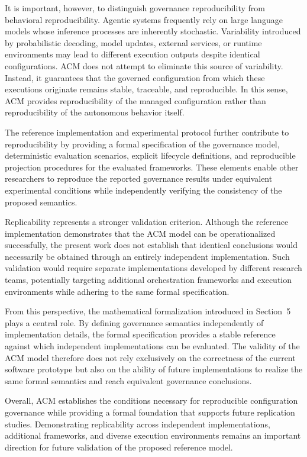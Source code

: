 \documentclass[10pt]{article}
\begin{document}
It is important, however, to distinguish governance reproducibility from behavioral reproducibility. Agentic systems frequently rely on large language models whose inference processes are inherently stochastic. Variability introduced by probabilistic decoding, model updates, external services, or runtime environments may lead to different execution outputs despite identical configurations. ACM does not attempt to eliminate this source of variability. Instead, it guarantees that the governed configuration from which these executions originate remains stable, traceable, and reproducible. In this sense, ACM provides reproducibility of the managed configuration rather than reproducibility of the autonomous behavior itself.

The reference implementation and experimental protocol further contribute to reproducibility by providing a formal specification of the governance model, deterministic evaluation scenarios, explicit lifecycle definitions, and reproducible projection procedures for the evaluated frameworks. These elements enable other researchers to reproduce the reported governance results under equivalent experimental conditions while independently verifying the consistency of the proposed semantics.

Replicability represents a stronger validation criterion. Although the reference implementation demonstrates that the ACM model can be operationalized successfully, the present work does not establish that identical conclusions would necessarily be obtained through an entirely independent implementation. Such validation would require separate implementations developed by different research teams, potentially targeting additional orchestration frameworks and execution environments while adhering to the same formal specification.

From this perspective, the mathematical formalization introduced in Section~5 plays a central role. By defining governance semantics independently of implementation details, the formal specification provides a stable reference against which independent implementations can be evaluated. The validity of the ACM model therefore does not rely exclusively on the correctness of the current software prototype but also on the ability of future implementations to realize the same formal semantics and reach equivalent governance conclusions.

Overall, ACM establishes the conditions necessary for reproducible configuration governance while providing a formal foundation that supports future replication studies. Demonstrating replicability across independent implementations, additional frameworks, and diverse execution environments remains an important direction for future validation of the proposed reference model.
\end{document}
